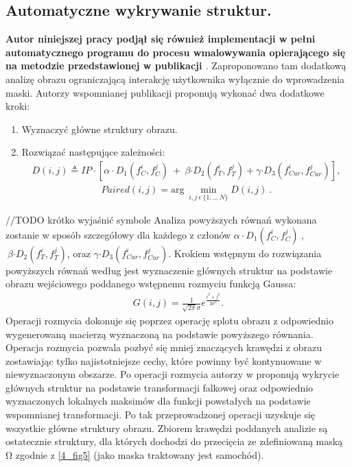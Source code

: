 \documentclass[12pt, twoside, openany]{report}
\theoremstyle{definition}
\begin{document}
\subsection{Automatyczne wykrywanie struktur.}
\textbf{Autor niniejszej pracy podjął się również implementacji w pełni automatycznego programu do procesu wmalowywania opierającego się na metodzie przedstawionej w publikacji \cite{SalientStrucTexProp}}. Zaproponowano tam  dodatkową analizę obrazu ograniczającą interakcję użytkownika wyłącznie do wprowadzenia maski. Autorzy wspomnianej publikacji proponują wykonać dwa dodatkowe kroki:
\begin{enumerate}
\item
Wyznaczyć główne struktury obrazu.
\item
Rozwiązać następujące zależności:
\begin{align}
D(i,j)\triangleq IP\cdot \left[\alpha \cdot D_1\left(f^i_C,f^j_C\right)\ +\ \beta {\cdot D}_2\left(f^i_T,f^j_T\right)+\gamma {\cdot D}_3\left(f^i_{Cur},f^j_{Cur}\right)\right],
\label{SalientDistance}
\end{align}
\begin{align}
Paired\left(i,j\right)={\mathrm{arg}\ \mathop{\mathrm{min}}_{i,j\ \epsilon \mathrm{\ }\{1,..,N\}} D(i,j)\ }.
\label{SalientPair}
\end{align}
\end{enumerate}
//TODO krótko wyjaśnić symbole
Analiza powyższych równań wykonana zostanie w sposób szczegółowy dla każdego z członów $\alpha \cdot D_1\left(f^i_C,f^j_C\right)\ $,$\ \beta {\cdot D}_2\left(f^i_T,f^j_T\right)$, oraz $\gamma {\cdot D}_3\left(f^i_{Cur},f^j_{Cur}\right)$. Krokiem wstępnym do rozwiązania powyższych równań według \cite{SalientStrucTexProp} jest wyznaczenie głównych struktur na podstawie obrazu wejściowego poddanego wstępnemu rozmyciu funkcją Gaussa:
\begin{align}
G\left(i,j\right)=\frac{1}{\sqrt{2\pi }\sigma }e^{\frac{i^2+j^2}{2{\sigma }^2}}.
\label{rozmycieGaussa}
\end{align}
Operacji rozmycia dokonuje się poprzez operację splotu obrazu z odpowiednio wygenerowaną macierzą wyznaczoną na podstawie powyższego równania. Operacja rozmycia pozwala pozbyć się mniej znaczących krawędzi z obrazu zostawiając tylko najistotniejsze cechy, które powinny być kontynuowane w niewyznaczonym obszarze. Po operacji rozmycia autorzy w \cite{SalientStrucTexProp} proponują wykrycie głównych struktur na podstawie transformacji falkowej oraz odpowiednio wyznaczonych lokalnych maksimów dla funkcji powstałych na podstawie wspomnianej transformacji. Po tak  przeprowadzonej operacji uzyskuje się wszystkie główne struktury obrazu. Zbiorem krawędzi poddanych analizie są ostatecznie struktury, dla których dochodzi do przecięcia ze zdefiniowaną maską $\mathrm{\Omega }$ zgodnie z \autoref{4_fig5} (jako maska traktowany jest samochód).
\end{document}
